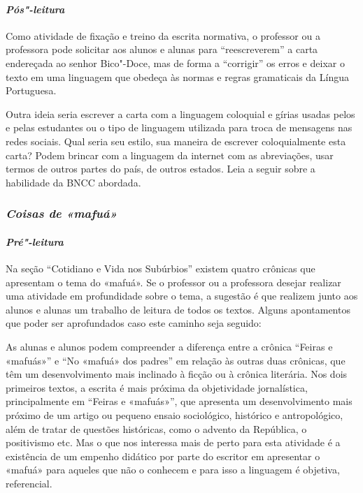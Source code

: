 \documentclass[11pt]{extarticle}
\begin{document}
\paragraph{\textit{Pós"-leitura}}

Como atividade de fixação e treino da escrita normativa, o professor ou
a professora pode solicitar aos alunos e alunas para ``reescreverem'' a
carta endereçada ao senhor Bico"-Doce, mas de forma a ``corrigir'' os
erros e deixar o texto em uma linguagem que obedeça às normas e regras
gramaticais da Língua Portuguesa.

Outra ideia seria escrever a carta com a linguagem coloquial e gírias
usadas pelos e pelas estudantes ou o tipo de linguagem utilizada para
troca de mensagens nas redes sociais. Qual seria seu estilo, sua maneira
de escrever coloquialmente esta carta? Podem brincar com a linguagem da
internet com as abreviações, usar termos de outros partes do país, de
outros estados. 
Leia a seguir sobre a habilidade da BNCC abordada.


\subsubsection{\textit{Coisas de «mafuá»}}

\paragraph{\textit{Pré"-leitura}}

Na seção ``Cotidiano e Vida nos Subúrbios'' existem quatro crônicas que
apresentam o tema do «mafuá». Se o professor ou a professora desejar
realizar uma atividade em profundidade sobre o tema, a sugestão é que
realizem junto aos alunos e alunas um trabalho de leitura de todos os
textos. Alguns apontamentos que poder ser aprofundados caso este caminho
seja seguido:


As alunas e alunos podem compreender a diferença entre a crônica
``Feiras e «mafuás»'' e ``No «mafuá» dos
padres'' em relação às outras duas crônicas, que têm um desenvolvimento
mais inclinado à ficção ou à crônica literária. Nos dois primeiros
textos, a escrita é mais próxima da objetividade jornalística,
principalmente em ``Feiras e «mafuás»'', que apresenta um
desenvolvimento mais próximo de um artigo ou pequeno ensaio sociológico,
histórico e antropológico, além de tratar de questões históricas, como o
advento da República, o positivismo etc. Mas o que nos interessa mais
de perto para esta atividade é a existência de um empenho didático por
parte do escritor em apresentar o «mafuá» para aqueles que não
o conhecem e para isso a linguagem é objetiva, referencial.
\end{document}
